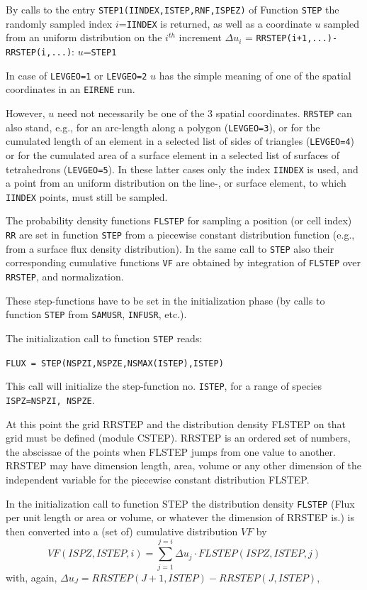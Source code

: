By calls to the entry \texttt{STEP1(IINDEX,ISTEP,RNF,ISPEZ)} of Function \texttt{STEP}
the randomly sampled index $i$=\texttt{IINDEX} is returned, as well as a coordinate $u$ sampled from an
uniform distribution on the $i^{th}$ increment $\Delta u_i$
= \texttt{RRSTEP(i+1,...)-RRSTEP(i,...)}: $u$=\texttt{STEP1}

In case of \texttt{LEVGEO=1} or \texttt{LEVGEO=2} $u$ has the simple meaning of one of the
spatial coordinates in an \texttt{EIRENE} run.

However, $u$ need not necessarily be one of the 3 spatial
coordinates. \texttt{RRSTEP} can also stand, e.g., for an arc-length along
a polygon (\texttt{LEVGEO=3}), or for the cumulated length of an element in
a selected list of sides of triangles (\texttt{LEVGEO=4}) or for the
cumulated area of a surface element in a selected list of surfaces
of tetrahedrons (\texttt{LEVGEO=5}). In these latter cases only the index
\texttt{IINDEX} is used, and a point from an uniform distribution on the
line-, or  surface element, to which \texttt{IINDEX} points, must
still be sampled.


The probability density functions \texttt{FLSTEP} for sampling a position
(or cell index) \texttt{RR}
are set in function \texttt{STEP} from a piecewise constant distribution
function (e.g., from a surface flux density distribution). In the same call to \texttt{STEP} also their corresponding
cumulative functions \texttt{VF} are obtained by integration of \texttt{FLSTEP} over \texttt{RRSTEP}, and normalization.

These step-functions have to be set in the initialization phase
(by calls to function \texttt{STEP} from \texttt{SAMUSR}, \texttt{INFUSR}, etc.).


The initialization call to function \texttt{STEP} reads:

\texttt{FLUX = STEP(NSPZI,NSPZE,NSMAX(ISTEP),ISTEP)}

This call will initialize the step-function no. \texttt{ISTEP}, for a range of species
\texttt{ISPZ=NSPZI, NSPZE}.

At this point the grid RRSTEP and the distribution density FLSTEP on that grid must be defined (module CSTEP).
RRSTEP is an ordered set of numbers, the abscissae of the points when FLSTEP jumps from one value to another.
RRSTEP may have dimension length, area, volume or any other dimension of the independent variable for the
piecewise constant distribution FLSTEP.

In the initialization call to function STEP the distribution density \texttt{FLSTEP} (Flux per unit length or area or volume,
or whatever the dimension of RRSTEP is.)
is then converted into
a (set of) cumulative distribution $VF$ by
\begin{equation}\nonumber
VF(ISPZ,ISTEP,i)= \sum_{j=1}^{j=i} \Delta u_j \cdot FLSTEP(ISPZ,ISTEP,j)
\end{equation}
with, again, $\Delta u_J=RRSTEP(J+1,ISTEP)-RRSTEP(J,ISTEP)$,

